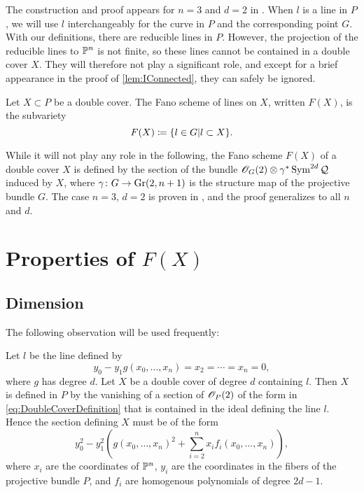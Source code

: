 The construction and proof appears for $n=3$ and $d=2$ in \cite{TihFanoSurface}. When $l$ is a line in $P$, we will use $l$ interchangeably for the curve in $P$ and the corresponding point $G$. With our definitions, there are reducible lines in $P$. However, the projection of the reducible lines to $\P^n$ is not finite, so these lines cannot be contained in a double cover $X$. They will therefore not play a significant role, and except for a brief appearance in the proof of \cref{lem:IConnected}, they can safely be ignored.


\begin{definition}
  Let $X \subset P$ be a double cover. The Fano scheme of lines on $X$, written $F(X)$, is the subvariety 
\[F(X) \coloneqq \set{l \in G \vert l \subset X}.\]
\end{definition}

\begin{remark}
	\label{rem:FanoSchemeBundle}
	While it will not play any role in the following, the Fano scheme $F(X)$ of a double cover $X$ is defined by the section of the bundle $\sO_G(2) \otimes \gamma^* \Sym^{2d} \mathcal{Q}$ induced by $X$, where $\gamma \from G \to \Gr(2,n+1)$ is the structure map of the projective bundle $G$.  The case $n=3$, $d=2$ is proven in \cite{TihFanoSurface}, and the proof generalizes to all $n$ and $d$.
\end{remark}

\section{Properties of $F(X)$}
\subsection{Dimension}


The following observation will be used frequently:
\begin{observation}
  \label{lem:ContainingLineForm}
  Let $l$ be the line defined by
  \begin{equation}
    \label{eq:LineEquations}
    y_0 - y_1g(x_0,\dots,x_n) = x_2 = \cdots = x_n = 0,
  \end{equation}
where $g$ has degree $d$. Let $X$ be a double cover of degree $d$ containing $l$. Then $X$ is defined in $P$ by the vanishing of a section of $\sO_P(2)$ of the form in \eqref{eq:DoubleCoverDefinition} that is contained in the ideal defining the line $l$. Hence the section defining $X$ must be of the form
\begin{equation}
  \label{eq:XContainingLineForm}
  y_0^2 - y_1^2\left(g(x_0,\dots,x_n)^2 + \sum_{i=2}^nx_if_i(x_0,\dots,x_n)\right),
\end{equation}
where $x_i$ are the coordinates of $\P^n$, $y_i$ are the coordinates in the fibers of the projective bundle $P$, and $f_i$ are homogenous polynomials of degree $2d-1$.
\end{observation}

